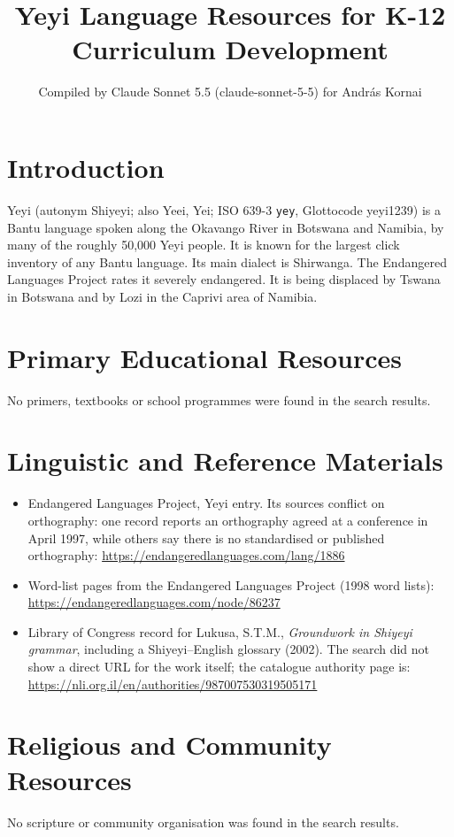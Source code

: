 \documentclass[12pt]{article}
\title{Yeyi Language Resources for K-12 Curriculum Development}
\author{Compiled by Claude Sonnet 5.5 (claude-sonnet-5-5) for Andr\'as Kornai}
\date{}
\begin{document}
\maketitle

\section{Introduction}
Yeyi (autonym Shiyeyi; also Yeei, Yei; ISO 639-3 \texttt{yey}, Glottocode yeyi1239) is a Bantu language spoken along the Okavango River in Botswana and Namibia, by many of the roughly 50,000 Yeyi people. It is known for the largest click inventory of any Bantu language. Its main dialect is Shirwanga. The Endangered Languages Project rates it severely endangered. It is being displaced by Tswana in Botswana and by Lozi in the Caprivi area of Namibia.

\section{Primary Educational Resources}
No primers, textbooks or school programmes were found in the search results.

\section{Linguistic and Reference Materials}
\begin{itemize}
\item Endangered Languages Project, Yeyi entry. Its sources conflict on orthography: one record reports an orthography agreed at a conference in April 1997, while others say there is no standardised or published orthography: \url{https://endangeredlanguages.com/lang/1886}
\item Word-list pages from the Endangered Languages Project (1998 word lists): \url{https://endangeredlanguages.com/node/86237}
\item Library of Congress record for Lukusa, S.T.M., \emph{Groundwork in Shiyeyi grammar}, including a Shiyeyi--English glossary (2002). The search did not show a direct URL for the work itself; the catalogue authority page is: \url{https://nli.org.il/en/authorities/987007530319505171}
\end{itemize}

\section{Religious and Community Resources}
No scripture or community organisation was found in the search results.
\end{document}
